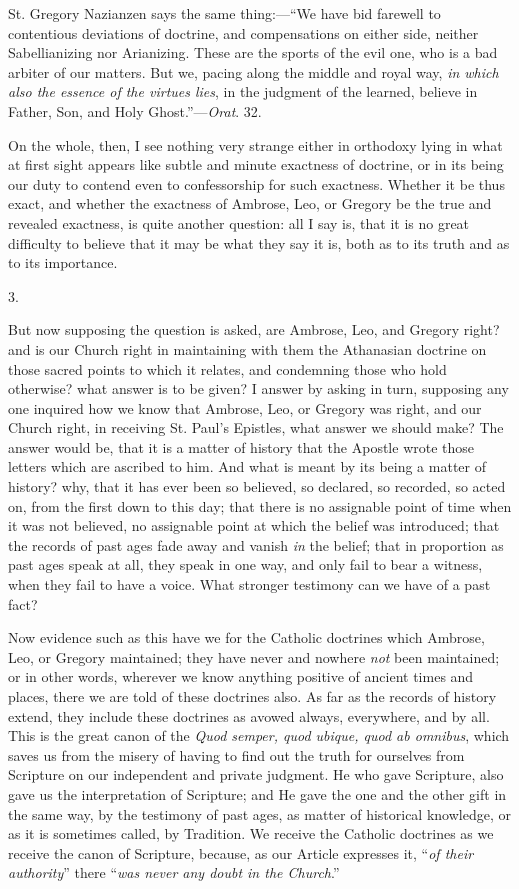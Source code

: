 St. Gregory Nazianzen says the same thing:—``We have bid
farewell to contentious deviations of doctrine, and compensations on
either side, neither Sabellianizing nor Arianizing. These are the
sports of the evil one, who is a bad arbiter of our matters. But we,
pacing along the middle and royal way, \emph{in which also the essence of
the virtues lies}, in the judgment of the learned, believe in
Father, Son, and Holy Ghost.''—\emph{Orat}. 32.

On the whole, then, I see nothing very strange either in orthodoxy lying in what at first sight appears like subtle and minute
exactness of doctrine, or in its being our duty to contend even to
confessorship for such exactness. Whether it be thus exact, and
whether the exactness of Ambrose, Leo, or Gregory be the true and
revealed exactness, is quite another question: all I say is, that it
is no great difficulty to believe that it may be what they say it is,
both as to its truth and as to its importance.

3.

But now supposing the question is asked, are Ambrose, Leo, and
Gregory right? and is our Church right in maintaining with them the
Athanasian doctrine on those sacred points to which it relates, and
condemning those who hold otherwise? what answer is to be given? I
answer by asking in turn, supposing any one inquired how we know that
Ambrose, Leo, or Gregory was right, and our Church right, in receiving
St. Paul's Epistles, what answer we should make? The answer would
be, that it is a matter of history that the Apostle wrote those
letters which are ascribed to him. And what is meant by its being a
matter of history? why, that it has ever been so believed, so
declared, so recorded, so acted on, from the first down to this day;
that there is no assignable point of time when it was not believed, no
assignable point at which the belief was introduced; that the records
of past ages fade away and vanish \emph{in} the belief; that in
proportion as past ages speak at all, they speak in one way, and only
fail to bear a witness, when they fail to have a voice. What stronger
testimony can we have of a past fact?

Now evidence such as this have we for the Catholic doctrines which
Ambrose, Leo, or Gregory maintained; they have never and nowhere \emph{not}
been maintained; or in other words, wherever we know anything positive
of ancient times and places, there we are told of these
doctrines also. As far as the records of history extend, they include
these doctrines as avowed always, everywhere, and by all. This is the
great canon of the \emph{Quod semper, quod ubique, quod ab omnibus},
which saves us from the misery of having to find out the truth for
ourselves from Scripture on our independent and private judgment. He
who gave Scripture, also gave us the interpretation of Scripture; and
He gave the one and the other gift in the same way, by the testimony
of past ages, as matter of historical knowledge, or as it is sometimes
called, by Tradition. We receive the Catholic doctrines as we receive
the canon of Scripture, because, as our Article expresses it, ``\emph{of
their authority}'' there ``\emph{was never any doubt in the
Church}.''

